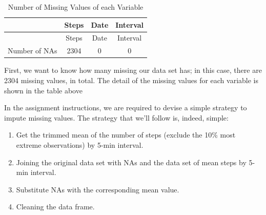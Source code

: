\documentclass[]{article}
\newenvironment{Shaded}{\begin{snugshade}}{\end{snugshade}}
\newcommand{\KeywordTok}[1]{\textcolor[rgb]{0.13,0.29,0.53}{\textbf{#1}}}
\newcommand{\DataTypeTok}[1]{\textcolor[rgb]{0.13,0.29,0.53}{#1}}
\newcommand{\StringTok}[1]{\textcolor[rgb]{0.31,0.60,0.02}{#1}}
\newcommand{\OperatorTok}[1]{\textcolor[rgb]{0.81,0.36,0.00}{\textbf{#1}}}
\newcommand{\NormalTok}[1]{#1}
\providecommand{\tightlist}{%
  \setlength{\itemsep}{0pt}\setlength{\parskip}{0pt}}
\begin{document}
\begin{Shaded}
\end{Shaded}

\begin{longtable}[]{@{}lccc@{}}
\caption{Number of Missing Values of each Variable}\tabularnewline
\toprule
& Steps & Date & Interval\tabularnewline
\midrule
\endfirsthead
\toprule
& Steps & Date & Interval\tabularnewline
\midrule
\endhead
Number of NAs & 2304 & 0 & 0\tabularnewline
\bottomrule
\end{longtable}

First, we want to know how many missing our data set has; in this case,
there are 2304 missing values, in total. The detail of the missing
values for each variable is shown in the table above

In the assignment instructions, we are required to devise a simple
strategy to impute missing values. The strategy that we'll follow is,
indeed, simple:

\begin{enumerate}
\def\labelenumi{\alph{enumi}.}
\tightlist
\item
  Get the trimmed mean of the number of steps (exclude the 10\% most
  extreme observations) by 5-min interval.
\item
  Joining the original data set with NAs and the data set of mean steps
  by 5-min interval.
\item
  Substitute NAs with the corresponding mean value.
\item
  Cleaning the data frame.
\end{enumerate}
\end{document}
